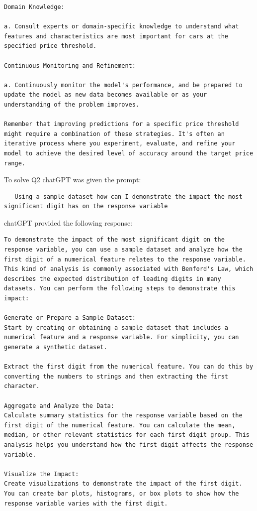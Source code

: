 \documentclass{article}
\begin{document}
\begin{titlepage}
\begin{verbatim}
Domain Knowledge:

a. Consult experts or domain-specific knowledge to understand what features and characteristics are most important for cars at the specified price threshold.

Continuous Monitoring and Refinement:

a. Continuously monitor the model's performance, and be prepared to update the model as new data becomes available or as your understanding of the problem improves.

Remember that improving predictions for a specific price threshold might require a combination of these strategies. It's often an iterative process where you experiment, evaluate, and refine your model to achieve the desired level of accuracy around the target price range.
\end{verbatim}
\newpage
To solve Q2 chatGPT was given the prompt:
\begin{verbatim}
   Using a sample dataset how can I demonstrate the impact the most significant digit has on the response variable 
\end{verbatim}
chatGPT provided the following response: 
\begin{verbatim}
To demonstrate the impact of the most significant digit on the response variable, you can use a sample dataset and analyze how the first digit of a numerical feature relates to the response variable. This kind of analysis is commonly associated with Benford's Law, which describes the expected distribution of leading digits in many datasets. You can perform the following steps to demonstrate this impact:

Generate or Prepare a Sample Dataset:
Start by creating or obtaining a sample dataset that includes a numerical feature and a response variable. For simplicity, you can generate a synthetic dataset.

Extract the first digit from the numerical feature. You can do this by converting the numbers to strings and then extracting the first character.

Aggregate and Analyze the Data:
Calculate summary statistics for the response variable based on the first digit of the numerical feature. You can calculate the mean, median, or other relevant statistics for each first digit group. This analysis helps you understand how the first digit affects the response variable.

Visualize the Impact:
Create visualizations to demonstrate the impact of the first digit. You can create bar plots, histograms, or box plots to show how the response variable varies with the first digit.


\end{verbatim}
\end{titlepage}
\end{document}
